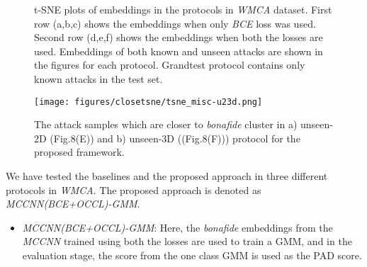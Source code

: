 \documentclass[journal]{IEEEtran}
\begin{document}
\begin{figure*}[ht]


\centering
  \hspace{-4.2em}
  \hspace{-4.2em}
  \vspace{-2em}

 \centering
  \hspace{-4.2em}
  \hspace{-4.2em}
  \caption{t-SNE plots of embeddings in the protocols in \textit{WMCA} dataset. First row (a,b,c) shows the embeddings when only \textit{BCE} loss was used. Second row (d,e,f) shows the embeddings when both the losses are used. Embeddings of both known and unseen attacks are shown in the figures for each protocol. Grandtest protocol contains only known attacks in the test set.}
 \label{fig:tsne}

\end{figure*}

\begin{figure}[h]
     \centering
         \texttt{[image: figures/closetsne/tsne\_misc-u23d.png]}

\caption{The attack samples which are closer to \textit{bonafide} cluster in a) unseen-2D (Fig.8(E)) and b) unseen-3D ((Fig.8(F))) protocol for the proposed framework.}
 \label{fig:tsne_close}
\end{figure}

We have tested the baselines and the proposed approach in three different protocols in \textit{WMCA}. The proposed approach is denoted as \textit{MCCNN(BCE+OCCL)-GMM}.

\begin{itemize}

\item \textit{MCCNN(BCE+OCCL)-GMM}: Here, the \textit{bonafide} embeddings from the \textit{MCCNN} trained using both the losses are used to train a GMM, and in the evaluation stage, the score from the one class GMM is used as the PAD score.

\end{itemize}
\end{document}
